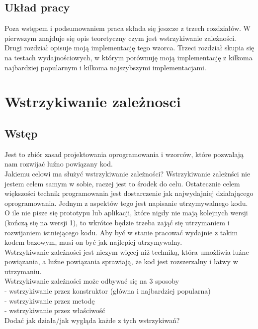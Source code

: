 \documentclass[12pt]{article}
\begin{document}
\subsection{Układ pracy}
Poza wstępem i podsumowaniem praca składa się jeszcze z trzech rozdziałów. W pierwszym znajduje się opis teoretyczny czym jest wstrzykiwanie zależności. Drugi rozdział opisuje moją implementację tego wzorca. Trzeci rozdział skupia się na testach wydajnościowych, w którym porównuję moją implementację z kilkoma najbardziej popularnym i kilkoma najszybszymi implementacjami.



\clearpage

\section{Wstrzykiwanie zależnosci}
\subsection{Wstęp}
Jest to zbiór zasad projektowania oprogramowania i wzorców, które pozwalają nam rozwijać luźno powiązany kod.\\
Jakiemu celowi ma służyć wstrzykiwanie zależności? Wstrzykiwanie zależnści nie jestem celem samym w sobie, raczej jest to środek do celu. Ostatecznie celem większości technik programowania jest dostarczenie jak najwydajniej działającego oprogramowania. Jednym z aspektów tego jest napisanie utrzymywalnego kodu.\\
O ile nie pisze się prototypu lub aplikacji, które nigdy nie mają kolejnych wersji (kończą się na wersji 1), to wkrótce będzie trzeba zająć się utrzymaniem i rozwijaniem istniejącego kodu. Aby być w stanie pracować wydajnie z takim kodem bazowym, musi on być jak najlepiej utrzymywalny.\\
Wstrzykiwanie zależności jest niczym więcej niż techniką, która umożliwia luźne powiązania, a luźne powiązania sprawiają, że kod jest rozszerzalny i łatwy w utrzymaniu. \cite{dependency_injection}\\
Wstrzykiwanie zależności może odbywać się na 3 sposoby\\
- wstrzykiwanie przez konstruktor (główna i najbardziej popularna)\\
- wstrzykiwanie przez metodę\\
- wstrzykiwanie przez właściwość\\
{\color{red} Dodać jak działa/jak wygląda każde z tych wstrzykiwań?}
\end{document}
